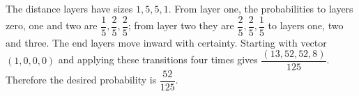 The distance layers have sizes $1,5,5,1$. From layer one, the probabilities to layers zero, one and two are $\dfrac{1}{5},\dfrac{2}{5},\dfrac{2}{5}$; from layer two they are $\dfrac{2}{5},\dfrac{2}{5},\dfrac{1}{5}$ to layers one, two and three. The end layers move inward with certainty. Starting with vector $(1,0,0,0)$ and applying these transitions four times gives $\dfrac{(13,52,52,8)}{125}$. Therefore the desired probability is $\boxed{\dfrac{52}{125}}$.
